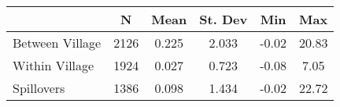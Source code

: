 \begin{tabular}{l*{5}{c}}\hline&\multicolumn{1}{c}{N}&\multicolumn{1}{c}{Mean}&\multicolumn{1}{c}{St. Dev}&\multicolumn{1}{c}{Min}&\multicolumn{1}{c}{Max}\\ \hline 
Between Village & 2126 & 0.225 & 2.033 & -0.02 & 20.83 \\
Within Village & 1924 & 0.027 & 0.723 & -0.08 & 7.05 \\
Spillovers & 1386 & 0.098 & 1.434 & -0.02 & 22.72 \\
\hline \end{tabular}
